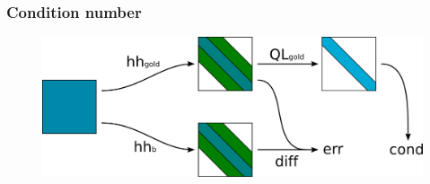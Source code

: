 \documentclass[serif, 12pt]{beamer}
\begin{document}

\begin{frame}

\frametitle{Condition number}

\begin{figure}[h]
	\includegraphics[width=\linewidth]{img/exp4}
\end{figure}


\end{frame}

\end{document}
